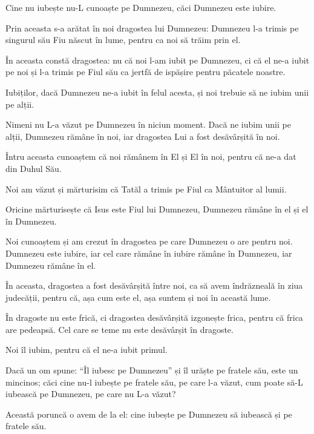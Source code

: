 {Cine nu iubește nu-L cunoaște pe Dumnezeu, căci Dumnezeu este iubire.

Prin aceasta s-a arătat în noi dragostea lui Dumnezeu: Dumnezeu l-a trimis pe singurul său Fiu născut în lume, pentru ca noi să trăim prin el.

În aceasta constă dragostea: nu că noi l-am iubit pe Dumnezeu, ci că el ne-a iubit pe noi și l-a trimis pe Fiul său ca jertfă de ispășire pentru păcatele noastre.

Iubiților, dacă Dumnezeu ne-a iubit în felul acesta, și noi trebuie să ne iubim unii pe alții.

Nimeni nu L-a văzut pe Dumnezeu în niciun moment. Dacă ne iubim unii pe alții, Dumnezeu rămâne în noi, iar dragostea Lui a fost desăvârșită în noi.


\par }{\PP {}Întru aceasta cunoaștem că noi rămânem în El și El în noi, pentru că ne-a dat din Duhul Său.

Noi am văzut și mărturisim că Tatăl a trimis pe Fiul ca Mântuitor al lumii.

Oricine mărturisește că Isus este Fiul lui Dumnezeu, Dumnezeu rămâne în el și el în Dumnezeu.

Noi cunoaștem și am crezut în dragostea pe care Dumnezeu o are pentru noi. Dumnezeu este iubire, iar cel care rămâne în iubire rămâne în Dumnezeu, iar Dumnezeu rămâne în el.

În aceasta, dragostea a fost desăvârșită între noi, ca să avem îndrăzneală în ziua judecății, pentru că, așa cum este el, așa suntem și noi în această lume.

În dragoste nu este frică, ci dragostea desăvârșită izgonește frica, pentru că frica are pedeapsă. Cel care se teme nu este desăvârșit în dragoste.

Noi îl iubim, pentru că el ne-a iubit primul.

Dacă un om spune: “Îl iubesc pe Dumnezeu” și îl urăște pe fratele său, este un mincinos; căci cine nu-l iubește pe fratele său, pe care l-a văzut, cum poate să-L iubească pe Dumnezeu, pe care nu L-a văzut?

Această poruncă o avem de la el: cine iubește pe Dumnezeu să iubească și pe fratele său.



\par }
